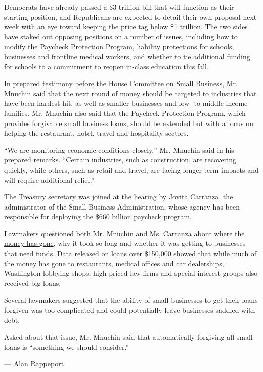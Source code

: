 Democrats have already passed a \$3 trillion bill that will function as
their starting position, and Republicans are expected to detail their
own proposal next week with an eye toward keeping the price tag below
\$1 trillion. The two sides have staked out opposing positions on a
number of issues, including how to modify the Paycheck Protection
Program, liability protections for schools, businesses and frontline
medical workers, and whether to tie additional funding for schools to a
commitment to reopen in-class education this fall.

In prepared testimony before the House Committee on Small Business, Mr.
Mnuchin said that the next round of money should be targeted to
industries that have been hardest hit, as well as smaller businesses and
low- to middle-income families. Mr. Mnuchin also said that the Paycheck
Protection Program, which provides forgivable small business loans,
should be extended but with a focus on helping the restaurant, hotel,
travel and hospitality sectors.

``We are monitoring economic conditions closely,'' Mr. Mnuchin said in
his prepared remarks. ``Certain industries, such as construction, are
recovering quickly, while others, such as retail and travel, are facing
longer-term impacts and will require additional relief.''

The Treasury secretary was joined at the hearing by Jovita Carranza, the
administrator of the Small Business Administration, whose agency has
been responsible for deploying the \$660 billion paycheck program.

Lawmakers questioned both Mr. Mnuchin and Ms. Carranza about
\href{https://www.nytimes.com/2020/07/06/us/ppp-small-business-loans.html}{where
the money has gone}, why it took so long and whether it was getting to
businesses that need funds. Data released on loans over \$150,000 showed
that while much of the money has gone to restaurants, medical offices
and car dealerships, Washington lobbying shops, high-priced law firms
and special-interest groups also received big loans.

Several lawmakers suggested that the ability of small businesses to get
their loans forgiven was too complicated and could potentially leave
businesses saddled with debt.

Asked about that issue, Mr. Mnuchin said that automatically forgiving
all small loans is ``something we should consider.''

--- \href{https://www.nytimes.com/by/alan-rappeport}{Alan Rappeport}

